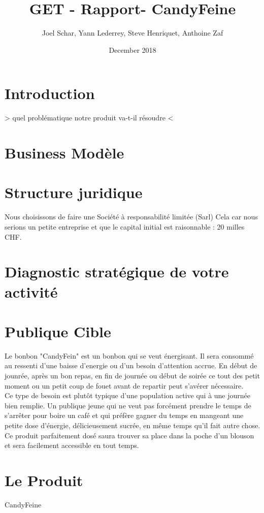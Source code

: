 \documentclass[12pt]{article}
\title{GET - Rapport- CandyFeine}
\author{Joel Schar, Yann Lederrey, Steve Henriquet, Anthoine Zaf }
\date{December 2018}
\begin{document}
\maketitle

\section{Introduction}
> quel problématique notre produit va-t-il résoudre <

\section{Business Modèle}

\section{Structure juridique}
Nous choisissons de faire une Société à responsabilité limitée (Sarl)
Cela car nous serions un petite entreprise et que le capital initial est raisonnable : 20 milles CHF.

\section{Diagnostic stratégique de votre activité}

\section{Publique Cible}
Le bonbon "CandyFein" est un bonbon qui se veut énergisant. Il sera consommé au ressenti d'une baisse d'energie ou d'un besoin d'attention accrue. En début de jounrée, après un bon repas, en fin de journée ou début de soirée ce tout des petit moment ou un petit coup de fouet avant de repartir peut s'avérer nécessaire.\\
Ce type de besoin est plutôt typique d'une population active qui à une journée bien remplie. Un publique jeune qui ne veut pas forcément prendre le temps de s'arrêter pour boire un café et qui préfère gagner du temps en mangeant une petite dose d'énergie, délicieusement sucrée, en même temps qu'il fait autre chose.\\
Ce produit parfaitement dosé saura trouver sa place dans la poche d'un blouson et sera facilement accessible en tout temps.\\

\section{Le Produit}
CandyFeine
\end{document}
